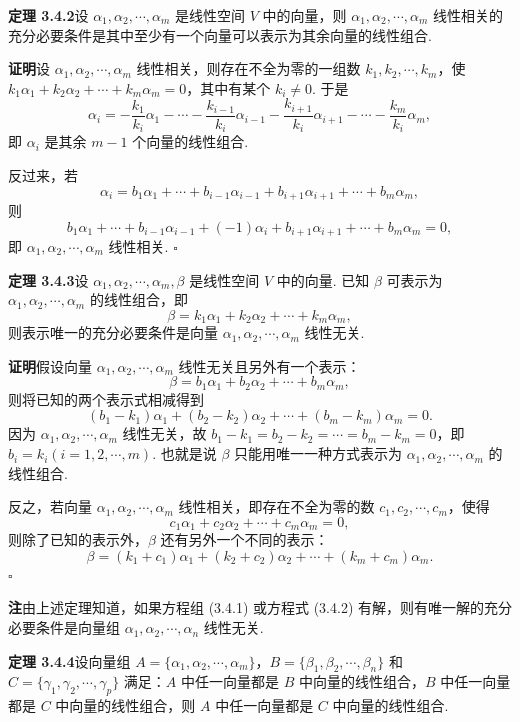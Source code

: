 \documentclass[UTF8, 12pt, fontset=fandol, oneside]{ctexart}
\begin{document}
\noindent\textbf{定理 3.4.2}\quad 设 $\alpha_1,\alpha_2,\cdots,\alpha_m$ 是线性空间 $V$ 中的向量，则 $\alpha_1,\alpha_2,\cdots,\alpha_m$ 线性相关的充分必要条件是其中至少有一个向量可以表示为其余向量的线性组合.

\noindent\textbf{证明}\quad 设 $\alpha_1,\alpha_2,\cdots,\alpha_m$ 线性相关，则存在不全为零的一组数 $k_1,k_2,\cdots,k_m$，使 $k_1\alpha_1+k_2\alpha_2+\cdots+k_m\alpha_m=0$，其中有某个 $k_i\neq 0$. 于是
\[
\alpha_i=-\frac{k_1}{k_i}\alpha_1-\cdots-\frac{k_{i-1}}{k_i}\alpha_{i-1}-\frac{k_{i+1}}{k_i}\alpha_{i+1}-\cdots-\frac{k_m}{k_i}\alpha_m,
\]
即 $\alpha_i$ 是其余 $m-1$ 个向量的线性组合.

反过来，若
\[
\alpha_i=b_1\alpha_1+\cdots+b_{i-1}\alpha_{i-1}+b_{i+1}\alpha_{i+1}+\cdots+b_m\alpha_m,
\]
则
\[
b_1\alpha_1+\cdots+b_{i-1}\alpha_{i-1}+(-1)\alpha_i+b_{i+1}\alpha_{i+1}+\cdots+b_m\alpha_m=0,
\]
即 $\alpha_1,\alpha_2,\cdots,\alpha_m$ 线性相关. $\square$

\noindent\textbf{定理 3.4.3}\quad 设 $\alpha_1,\alpha_2,\cdots,\alpha_m,\beta$ 是线性空间 $V$ 中的向量. 已知 $\beta$ 可表示为 $\alpha_1,\alpha_2,\cdots,\alpha_m$ 的线性组合，即
\[
\beta=k_1\alpha_1+k_2\alpha_2+\cdots+k_m\alpha_m,
\]
则表示唯一的充分必要条件是向量 $\alpha_1,\alpha_2,\cdots,\alpha_m$ 线性无关.

\noindent\textbf{证明}\quad 假设向量 $\alpha_1,\alpha_2,\cdots,\alpha_m$ 线性无关且另外有一个表示：
\[
\beta=b_1\alpha_1+b_2\alpha_2+\cdots+b_m\alpha_m,
\]
则将已知的两个表示式相减得到
\[
(b_1-k_1)\alpha_1+(b_2-k_2)\alpha_2+\cdots+(b_m-k_m)\alpha_m=0.
\]
因为 $\alpha_1,\alpha_2,\cdots,\alpha_m$ 线性无关，故 $b_1-k_1=b_2-k_2=\cdots=b_m-k_m=0$，即 $b_i=k_i(i=1,2,\cdots,m)$. 也就是说 $\beta$ 只能用唯一一种方式表示为 $\alpha_1,\alpha_2,\cdots,\alpha_m$ 的线性组合.

反之，若向量 $\alpha_1,\alpha_2,\cdots,\alpha_m$ 线性相关，即存在不全为零的数 $c_1,c_2,\cdots,c_m$，使得
\[
c_1\alpha_1+c_2\alpha_2+\cdots+c_m\alpha_m=0,
\]
则除了已知的表示外，$\beta$ 还有另外一个不同的表示：
\[
\beta=(k_1+c_1)\alpha_1+(k_2+c_2)\alpha_2+\cdots+(k_m+c_m)\alpha_m.
\]
$\square$

\noindent\textbf{注}\quad 由上述定理知道，如果方程组 (3.4.1) 或方程式 (3.4.2) 有解，则有唯一解的充分必要条件是向量组 $\alpha_1,\alpha_2,\cdots,\alpha_n$ 线性无关.

\noindent\textbf{定理 3.4.4}\quad 设向量组 $A=\{\alpha_1,\alpha_2,\cdots,\alpha_m\}$，$B=\{\beta_1,\beta_2,\cdots,\beta_n\}$ 和 $C=\{\gamma_1,\gamma_2,\cdots,\gamma_p\}$ 满足：$A$ 中任一向量都是 $B$ 中向量的线性组合，$B$ 中任一向量都是 $C$ 中向量的线性组合，则 $A$ 中任一向量都是 $C$ 中向量的线性组合.
\end{document}
